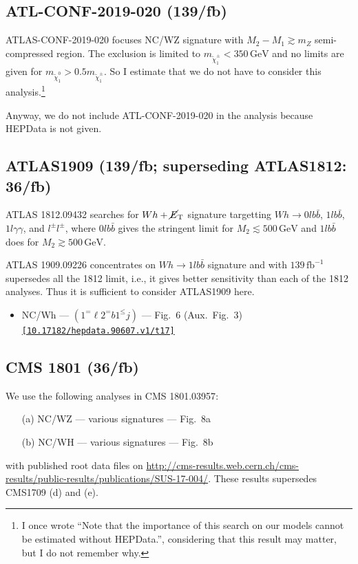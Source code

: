 \documentclass[a4paper,10pt,captions=tableheading,DIV=14]{scrartcl}
\numberwithin{equation}{section}
\newcommand\w[1]{_{\mathrm{#1}}}
\newcommand\unit[1]{\,\mathrm{#1}\xspace}
\newcommand\GeV{\unit{GeV}}
\newcommand\ifb{\unit{fb^{-1}}}
\newcommand\doi[1]{{\footnotesize \texttt{\href{https://doi.org/#1}{[#1]}}}}
\newcommand\neut  [1][\relax]{{\tilde\chi^0_{#1}}}
\newcommand\charPM[1][\relax]{{\tilde\chi^\pm_{#1}}}
\newcommand\mET{\cancel{E}\w T}
\begin{document}
\subsection{ATL-CONF-2019-020 (139/fb)}
ATLAS-CONF-2019-020 focuses NC/WZ signature with $M_2-M_1 \gtrsim m_Z$ semi-compressed region.
The exclusion is limited to $m_{\charPM[1]}<350\GeV$ and no limits are given for $m_{\neut[1]}>0.5m_{\charPM[1]}$.
So I estimate that we do not have to consider this analysis.\footnote{I once wrote ``Note that the importance of this search on our models cannot be estimated without HEPData.'', considering that this result may matter, but I do not remember why.}

Anyway, we do not include ATL-CONF-2019-020 in the analysis because HEPData is not given.



\subsection{ATLAS1909 (139/fb; superseding ATLAS1812: 36/fb)}
ATLAS 1812.09432\cite{1812.09432} searches for $Wh+\mET$ signature targetting $Wh\to 0lb\bar b$, $1lb\bar b$, $1l\gamma\gamma$, and $l^\pm l^\pm$, where $0lb\bar b$ gives the stringent limit for $M_2\lesssim500\GeV$ and $1lb\bar b$ does for $M_2\gtrsim500\GeV$.

ATLAS 1909.09226\cite{1909.09226} concentrates on $Wh\to1lb\bar b$ signature and with $139\ifb$ supersedes all the 1812 limit, i.e., it gives better sensitivity than each of the 1812 analyses.
Thus it is sufficient to consider ATLAS1909 here.

\begin{itemize}
 \item NC/Wh --- $(1^=\ell2^=b 1^\le j)$ --- Fig.~6 (Aux.~Fig.~3) \doi{10.17182/hepdata.90607.v1/t17}
\end{itemize}



\subsection{CMS 1801 (36/fb)}
We use the following analyses in CMS 1801.03957\cite{1801.03957}:
\begin{itemize}
 \item[(a)]  NC/WZ                 --- various signatures --- Fig.~8a
 \item[(b)]  NC/WH                 --- various signatures --- Fig.~8b
\end{itemize}
with published root data files on \url{http://cms-results.web.cern.ch/cms-results/public-results/publications/SUS-17-004/}.
These results supersedes CMS1709 (d) and (e).
\end{document}
